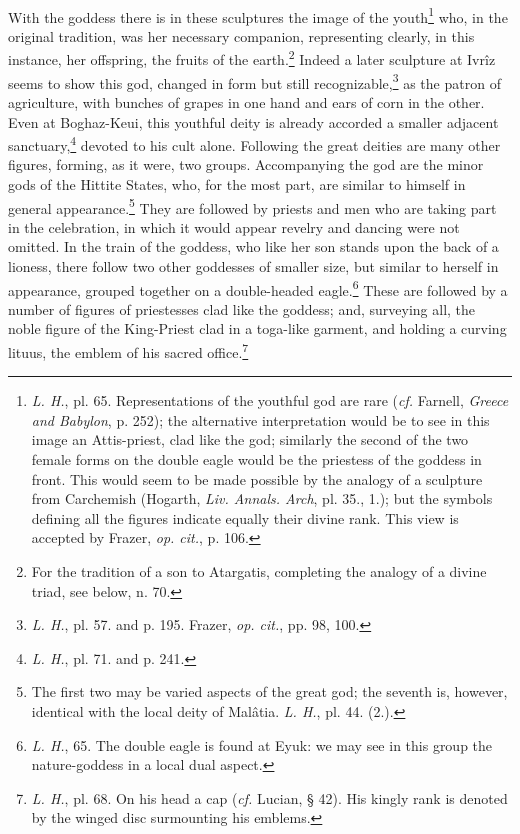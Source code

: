 \documentclass[a4paper, 11pt, oneside, polutonikogreek, english]{article}
\begin{document}
\paragraph{}
With the goddess there is in these sculptures the image of the youth\footnote{\emph{L. H.}, pl. 65. Representations of the youthful god are rare (\emph{cf.} Farnell, \emph{Greece and Babylon}, p. 252); the alternative interpretation would be to see in this image an Attis-priest, clad like the god; similarly the second of the two female forms on the double eagle would be the priestess of the goddess in front. This would seem to be made possible by the analogy of a sculpture from Carchemish (Hogarth, \emph{Liv. Annals. Arch}, pl. 35., 1.); but the symbols defining all the figures indicate equally their divine rank. This view is accepted by Frazer, \emph{op. cit.}, p. 106.} who, in the original tradition, was her necessary companion, representing clearly, in this instance, her offspring, the fruits of the earth.\footnote{For the tradition of a son to Atargatis, completing the analogy of a divine triad, see below, n. 70.} Indeed a later sculpture at Ivrîz seems to show this god, changed in form but still recognizable,\footnote{\emph{L. H.}, pl. 57. and p. 195. Frazer, \emph{op. cit.}, pp. 98, 100.} as the patron of agriculture, with bunches of grapes in one hand and ears of corn in the other. Even at Boghaz-Keui, this youthful deity is already accorded a smaller adjacent sanctuary,\footnote{\emph{L. H.}, pl. 71. and p. 241.} devoted to his cult alone. Following the great deities are many other figures, forming, as it were, two groups. Accompanying the god are the minor gods of the Hittite States, who, for the most part, are similar to himself in general appearance.\footnote{The first two may be varied aspects of the great god; the seventh is, however, identical with the local deity of Malâtia. \emph{L. H.}, pl. 44. (2.).} They are followed by priests and men who are taking part in the celebration, in which it would appear revelry and dancing were not omitted. In the train of the goddess, who like her son stands upon the back of a lioness, there follow two other goddesses of smaller size, but similar to herself in appearance, grouped together on a double-headed eagle.\footnote{\emph{L. H.}, 65. The double eagle is found at Eyuk: we may see in this group the nature-goddess in a local dual aspect.} These are followed by a number of figures of priestesses clad like the goddess; and, surveying all, the noble figure of the King-Priest clad in a toga-like garment, and holding a curving lituus, the emblem of his sacred office.\footnote{\emph{L. H.}, pl. 68. On his head a cap (\emph{cf.} Lucian, § 42). His kingly rank is denoted by the winged disc surmounting his emblems.}
\end{document}
